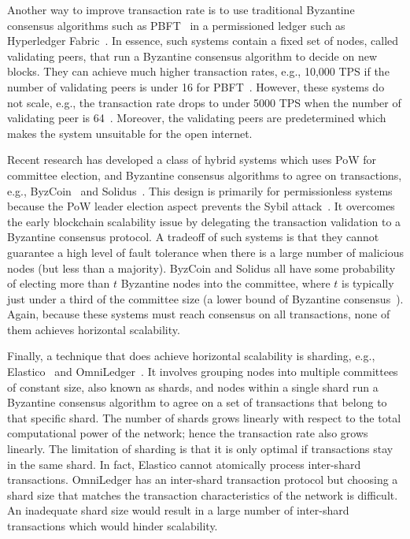 Another way to improve transaction rate is to use traditional Byzantine consensus algorithms such as PBFT~\cite{castro1999practical} in a permissioned ledger such as Hyperledger Fabric~\cite{cachin2016architecture}.
In essence, such systems contain a fixed set of nodes, called validating peers, that run a Byzantine consensus algorithm to decide on new blocks.
They can achieve much higher transaction rates, e.g., 10,000 TPS if the number of validating peers is under 16 for PBFT~\cite[Section 5.2]{miller2016honey}.
However, these systems do not scale, e.g., the transaction rate drops to under 5000 TPS when the number of validating peer is 64~\cite[Section 5.2]{miller2016honey}.
Moreover, the validating peers are predetermined which makes the system unsuitable for the open internet.

Recent research has developed a class of hybrid systems which uses PoW for committee election,
and Byzantine consensus algorithms to agree on transactions, e.g., ByzCoin~\cite{kogias2016enhancing} and Solidus~\cite{abraham2016solidus}.
This design is primarily for permissionless systems because the PoW leader election aspect prevents the Sybil attack~\cite{douceur2002sybil}.
It overcomes the early blockchain scalability issue by delegating the transaction validation to a Byzantine consensus protocol.
A tradeoff of such systems is that they cannot guarantee a high level of fault tolerance when there is a large number of malicious nodes (but less than a majority).
ByzCoin and Solidus all have some probability of electing more than $t$ Byzantine nodes into the committee,
where $t$ is typically just under a third of the committee size (a lower bound of Byzantine consensus~\cite{pease1980reaching}).
Again, because these systems must reach consensus on all transactions,
none of them achieves horizontal scalability.

Finally, a technique that does achieve horizontal scalability is sharding, e.g., Elastico~\cite{luu2016elastico} and OmniLedger~\cite{kokoris2017omniledger}.
It involves grouping nodes into multiple committees of constant size, also known as shards,
and nodes within a single shard run a Byzantine consensus algorithm to agree on a set of transactions that belong to that specific shard.
The number of shards grows linearly with respect to the total computational power of the network;
hence the transaction rate also grows linearly.
The limitation of sharding is that it is only optimal if transactions stay in the same shard.
In fact, Elastico cannot atomically process inter-shard transactions.
OmniLedger has an inter-shard transaction protocol but choosing a shard size that matches the transaction characteristics of the network is difficult.
An inadequate shard size would result in a large number of inter-shard transactions which would hinder scalability.


